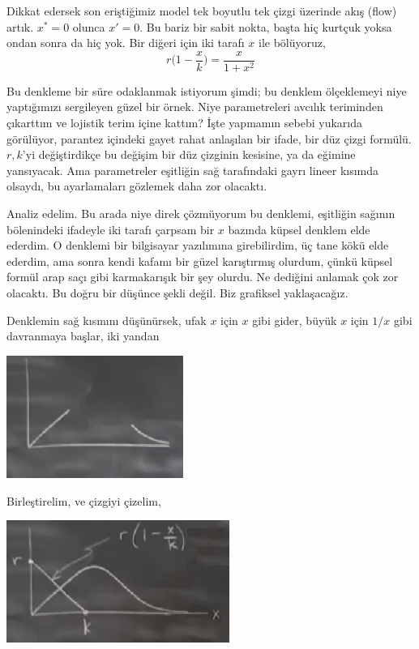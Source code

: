 \documentclass[12pt,fleqn]{article}\usepackage{../../common}
\begin{document}
Dikkat edersek son eriştiğimiz model tek boyutlu tek çizgi üzerinde akış
(flow) artık. $x^\ast=0$ olunca $x'=0$. Bu bariz bir sabit nokta, başta hiç kurtçuk
yoksa ondan sonra da hiç yok. Bir diğeri için iki tarafı $x$ ile bölüyoruz,
%
$$ r \bigg(1-\frac{x}{k}\bigg) = \frac{x}{1+x^2} $$

Bu denkleme bir süre odaklanmak istiyorum şimdi; bu denklem ölçeklemeyi
niye yaptığımızı sergileyen güzel bir örnek. Niye parametreleri avcılık
teriminden çıkarttım ve lojistik terim içine kattım? İşte yapmamın sebebi
yukarıda görülüyor, parantez içindeki gayet rahat anlaşılan bir ifade, bir düz
çizgi formülü. $r,k$'yi değiştirdikçe bu değişim bir düz çizginin kesisine, ya da
eğimine yansıyacak. Ama parametreler eşitliğin sağ tarafındaki gayrı lineer
kısımda olsaydı, bu ayarlamaları gözlemek daha zor olacaktı. 

Analiz edelim. Bu arada niye direk çözmüyorum bu denklemi, eşitliğin sağının
bölenindeki ifadeyle iki tarafı çarpsam bir $x$ bazında küpsel denklem elde
ederdim. O denklemi bir bilgisayar yazılımına girebilirdim, üç tane kökü elde
ederdim, ama sonra kendi kafamı bir güzel karıştırmış olurdum, çünkü küpsel
formül arap saçı gibi karmakarışık bir şey olurdu. Ne dediğini anlamak çok zor
olacaktı. Bu doğru bir düşünce şekli değil. Biz grafiksel yaklaşacağız.

Denklemin sağ kısmını düşünürsek, ufak $x$ için $x$ gibi gider, büyük $x$ için
$1/x$ gibi davranmaya başlar, iki yandan

\includegraphics[height=4cm]{04_03.png}

Birleştirelim, ve çizgiyi çizelim, 

\includegraphics[height=4cm]{04_04.png}
\end{document}
